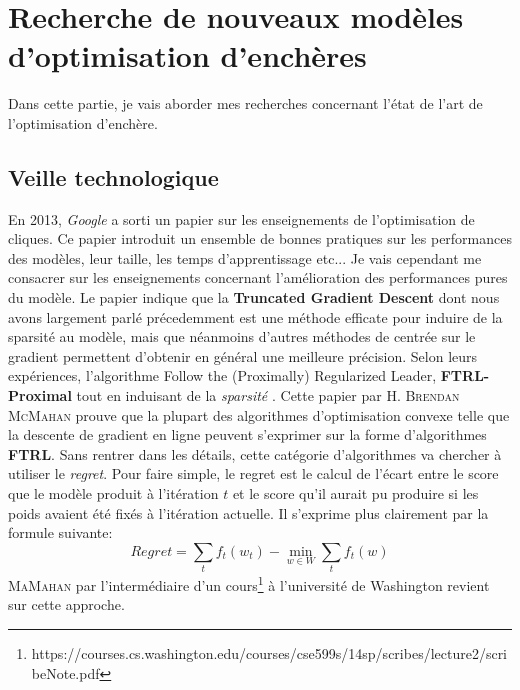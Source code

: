 \section{Recherche de nouveaux modèles d'optimisation d'enchères}
    Dans cette partie, je vais aborder mes recherches concernant l'état de l'art de l'optimisation d'enchère. 
    \subsection{Veille technologique}
    
    En 2013, \emph{Google} a sorti un papier \cite{mcmahan2013ad} sur les enseignements de l'optimisation de cliques. Ce papier introduit un ensemble de bonnes pratiques sur les performances des modèles, leur taille, les temps d'apprentissage etc... Je vais cependant me consacrer sur les enseignements concernant l'amélioration des performances pures du modèle. Le papier indique que la \textbf{Truncated Gradient Descent} dont nous avons largement parlé précedemment est une méthode efficate pour induire de la sparsité au modèle, mais que néanmoins d'autres méthodes de centrée sur le gradient permettent d'obtenir en général une meilleure précision. Selon leurs expériences, l'algorithme \fg Follow the (Proximally) Regularized Leader\og, \textbf{FTRL-Proximal} tout en induisant de la \emph{sparsité} \cite{mcmahan2011follow}. Cette papier par H. \textsc{Brendan McMahan} prouve que la plupart des algorithmes d'optimisation convexe telle que la descente de gradient en ligne peuvent s'exprimer sur la forme d'algorithmes \textbf{FTRL}. Sans rentrer dans les détails, cette catégorie d'algorithmes va chercher à utiliser le \emph{regret}. Pour faire simple, le regret est le calcul de l'écart entre le score que le modèle produit à l'itération $t$ et le score qu'il aurait pu produire si les poids avaient été fixés à l'itération actuelle. Il s'exprime plus clairement par la formule suivante: 
    \[
        Regret = \sum_{t} f_{t}(w_{t}) - \min_{w \in W} \sum_{t} f_{t}(w)
    \]
    \textsc{MaMahan} par l'intermédiaire d'un cours\footnote{https://courses.cs.washington.edu/courses/cse599s/14sp/scribes/lecture2/scribeNote.pdf} à l'université de Washington revient sur cette approche. \newline
